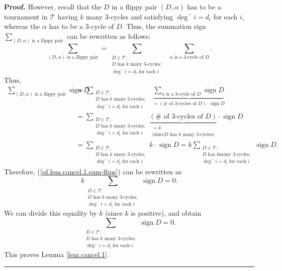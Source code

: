 \documentclass[numbers=enddot,12pt,final,onecolumn,notitlepage]{scrartcl}%
\numberwithin{exer}{subsection}
\theoremstyle{definition}
\newenvironment{proof}[1][Proof]{\noindent\textbf{#1.} }{\ \rule{0.5em}{0.5em}}
\let\sumnonlimits\sum
\renewcommand{\sum}{\sumnonlimits\limits}
\begin{document}
\begin{proof}
However, recall that the $D$ in a flippy pair $\left(  D,\alpha\right)  $ has
to be a tournament in $\mathcal{T}$ having $k$ many $3$-cycles and satisfying
$\deg^{-}i=d_{i}$ for each $i$, whereas the $\alpha$ has to be a $3$-cycle of
$D$. Thus, the summation sign $\sum_{\left(  D,\alpha\right)  \text{ is a
flippy pair}}$ can be rewritten as follows:%
\[
\sum_{\left(  D,\alpha\right)  \text{ is a flippy pair}}=\sum_{\substack{D\in
\mathcal{T};\\D\text{ has }k\text{ many }3\text{-cycles};\\\deg^{-}%
i=d_{i}\text{ for each }i}}\ \ \sum_{\alpha\text{ is a }3\text{-cycle of }D}.
\]
Thus,%
\begin{align*}
\sum_{\left(  D,\alpha\right)  \text{ is a flippy pair}}\operatorname*{sign}D
&  =\sum_{\substack{D\in\mathcal{T};\\D\text{ has }k\text{ many }%
3\text{-cycles};\\\deg^{-}i=d_{i}\text{ for each }i}}\ \ \underbrace{\sum
_{\alpha\text{ is a }3\text{-cycle of }D}\operatorname*{sign}D}_{=\left(
\#\text{ of }3\text{-cycles of }D\right)  \cdot\operatorname*{sign}D}\\
&  =\sum_{\substack{D\in\mathcal{T};\\D\text{ has }k\text{ many }%
3\text{-cycles};\\\deg^{-}i=d_{i}\text{ for each }i}}\underbrace{\left(
\#\text{ of }3\text{-cycles of }D\right)  }_{\substack{=k\\\text{(since
}D\text{ has }k\text{ many }3\text{-cycles)}}}\cdot\operatorname*{sign}D\\
&  =\sum_{\substack{D\in\mathcal{T};\\D\text{ has }k\text{ many }%
3\text{-cycles};\\\deg^{-}i=d_{i}\text{ for each }i}}k\cdot
\operatorname*{sign}D=k\sum_{\substack{D\in\mathcal{T};\\D\text{ has }k\text{
many }3\text{-cycles};\\\deg^{-}i=d_{i}\text{ for each }i}%
}\operatorname*{sign}D.
\end{align*}
Therefore, (\ref{pf.lem.cancel.1.sum-flips}) can be rewritten as%
\[
k\sum_{\substack{D\in\mathcal{T};\\D\text{ has }k\text{ many }3\text{-cycles}%
;\\\deg^{-}i=d_{i}\text{ for each }i}}\operatorname*{sign}D=0.
\]
We can divide this equality by $k$ (since $k$ is positive), and obtain
\[
\sum_{\substack{D\in\mathcal{T};\\D\text{ has }k\text{ many }3\text{-cycles}%
;\\\deg^{-}i=d_{i}\text{ for each }i}}\operatorname*{sign}D=0.
\]
This proves Lemma \ref{lem.cancel.1}.
\end{proof}
\end{document}
